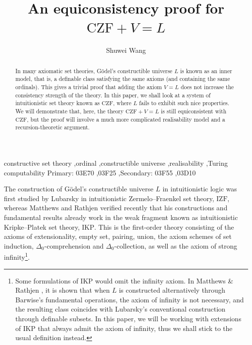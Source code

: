 \documentclass[preprint]{elsarticle}
\theoremstyle{plain}
\begin{document}
\begin{frontmatter}
  \title{An equiconsistency proof for \texorpdfstring{$\mathrm{CZF} + V = L$}{CZF + V = L}}
  \author{Shuwei Wang}

  \begin{abstract}
    In many axiomatic set theories, G\"odel's constructible universe $L$ is known as an inner model, that is, a definable class satisfying the same axioms (and containing the same ordinals). This gives a trivial proof that adding the axiom $V = L$ does not increase the consistency strength of the theory. In this paper, we shall look at a system of intuitionistic set theory known as $\mathrm{CZF}$, where $L$ fails to exhibit such nice properties. We will demonstrate that, here, the theory $\mathrm{CZF} + V = L$ is still equiconsistent with $\mathrm{CZF}$, but the proof will involve a much more complicated realisability model and a recursion-theoretic argument.
  \end{abstract}

  \begin{keyword}
    constructive set theory \sep ordinal \sep constructible universe \sep realisability \sep Turing computability
    \MSC[2020] Primary: 03E70 \sep 03F25 \sep Secondary: 03F55 \sep 03D10
  \end{keyword}
\end{frontmatter}

The construction of G\"odel's constructible universe $L$ in intuitionistic logic was first studied by Lubarsky \cite{lubarsky93-intuitionistic-l} in intuitionistic Zermelo--Fraenkel set theory, $\mathrm{IZF}$, whereas Matthews and Rathjen \cite[section 5]{matthews-rathjen24-constructible-universe} verified recently that his constructions and fundamental results already work in the weak fragment known as intuitionistic Kripke--Platek set theory, $\mathrm{IKP}$. This is the first-order theory consisting of the axioms of extensionality, empty set, pairing, union, the axiom schemes of set induction, $\Delta_0$-comprehension and $\Delta_0$-collection, as well as the axiom of strong infinity\footnote{Some formulations of $\mathrm{IKP}$ would omit the infinity axiom. In Matthews \& Rathjen \cite{matthews-rathjen24-constructible-universe}, it is shown that when $L$ is constructed alternatively through Barwise's fundamental operations, the axiom of infinity is not necessary, and the resulting class coincides with Lubarsky's conventional construction through definable subsets. In this paper, we will be working with extensions of $\mathrm{IKP}$ that always admit the axiom of infinity, thus we shall stick to the usual definition instead.}.
\end{document}
